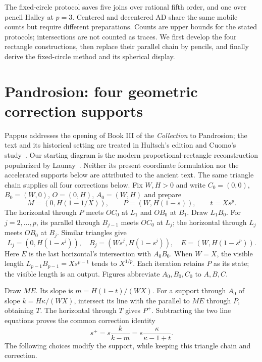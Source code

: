 \documentclass[11pt,a4paper]{article}
\theoremstyle{remark}\newtheorem{remark}[theorem]{Remark}
\begin{document}
The fixed-circle protocol saves five joins over rational fifth order, and one over pencil Halley at $p=3$. Centered and decentered AD share the same mobile counts but require different preparations. Counts are upper bounds for the stated protocols; intersections are not counted as traces. We first develop the four rectangle constructions, then replace their parallel chain by pencils, and finally derive the fixed-circle method and its spherical display.

\section{Pandrosion: four geometric correction supports}\label{sec:pandrosion}
Pappus addresses the opening of Book III of the \emph{Collection} to Pandrosion; the text and its historical setting are treated in Hultsch's edition and Cuomo's study~\cite{pappus1876,cuomo2000}. Our starting diagram is the modern proportional-rectangle reconstruction popularized by Launay~\cite{launayPandrosion}. Neither its present coordinate formulation nor the accelerated supports below are attributed to the ancient text. The same triangle chain supplies all four corrections below. Fix $W,H>0$ and write $C_0=(0,0)$, $B_0=(W,0)$, $O=(0,H)$, $A_0=(W,H)$ and prepare
\[
 M=(0,H(1-1/X)),\qquad P=(W,H(1-s)),\qquad t=Xs^p.
\]
The horizontal through $P$ meets $OC_0$ at $L_1$ and $OB_0$ at $B_1$. Draw $L_1B_0$. For $j=2,\ldots,p$, its parallel through $B_{j-1}$ meets $OC_0$ at $L_j$; the horizontal through $L_j$ meets $OB_0$ at $B_j$. Similar triangles give
\begin{equation}\label{eq:pandchain}
 L_j=(0,H(1-s^j)),\quad B_j=(Ws^j,H(1-s^j)),\quad E=(W,H(1-s^p)).
\end{equation}
Here $E$ is the last horizontal's intersection with $A_0B_0$. When $W=X$, the visible length $L_{p-1}B_{p-1}=Xs^{p-1}$ tends to $X^{1/p}$. Each iteration retains $P$ as its state; the visible length is an output. Figures abbreviate $A_0,B_0,C_0$ to $A,B,C$.

Draw $ME$. Its slope is $m=H(1-t)/(WX)$. For a support through $A_0$ of slope $k=H\kappa/(WX)$, intersect its line with the parallel to $ME$ through $P$, obtaining $T$. The horizontal through $T$ gives $P^+$. Subtracting the two line equations proves the common correction identity
\begin{equation}\label{eq:commonreport}
 s^+=s\frac{k}{k-m}=s\frac{\kappa}{\kappa-1+t}.
\end{equation}
The following choices modify the support, while keeping this triangle chain and correction.
\end{document}
